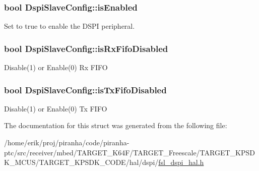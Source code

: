 \subsubsection[{\texorpdfstring{is\+Enabled}{isEnabled}}]{\setlength{\rightskip}{0pt plus 5cm}bool Dspi\+Slave\+Config\+::is\+Enabled}\hypertarget{structDspiSlaveConfig_a5ffbcd22f2cf3d37c7077bbeec5bda09}{}\label{structDspiSlaveConfig_a5ffbcd22f2cf3d37c7077bbeec5bda09}
Set to true to enable the D\+S\+PI peripheral. 
\subsubsection[{\texorpdfstring{is\+Rx\+Fifo\+Disabled}{isRxFifoDisabled}}]{\setlength{\rightskip}{0pt plus 5cm}bool Dspi\+Slave\+Config\+::is\+Rx\+Fifo\+Disabled}\hypertarget{structDspiSlaveConfig_a43ae46356c2bd0ee4655d14a8ed4bff9}{}\label{structDspiSlaveConfig_a43ae46356c2bd0ee4655d14a8ed4bff9}
Disable(1) or Enable(0) Rx F\+I\+FO 
\subsubsection[{\texorpdfstring{is\+Tx\+Fifo\+Disabled}{isTxFifoDisabled}}]{\setlength{\rightskip}{0pt plus 5cm}bool Dspi\+Slave\+Config\+::is\+Tx\+Fifo\+Disabled}\hypertarget{structDspiSlaveConfig_a65f1d87361fb1474f06f39ce29227e44}{}\label{structDspiSlaveConfig_a65f1d87361fb1474f06f39ce29227e44}
Disable(1) or Enable(0) Tx F\+I\+FO 

The documentation for this struct was generated from the following file\+:\begin{DoxyCompactItemize}
\item 
/home/erik/proj/piranha/code/piranha-\/ptc/src/receiver/mbed/\+T\+A\+R\+G\+E\+T\+\_\+\+K64\+F/\+T\+A\+R\+G\+E\+T\+\_\+\+Freescale/\+T\+A\+R\+G\+E\+T\+\_\+\+K\+P\+S\+D\+K\+\_\+\+M\+C\+U\+S/\+T\+A\+R\+G\+E\+T\+\_\+\+K\+P\+S\+D\+K\+\_\+\+C\+O\+D\+E/hal/dspi/\hyperlink{fsl__dspi__hal_8h}{fsl\+\_\+dspi\+\_\+hal.\+h}\end{DoxyCompactItemize}
